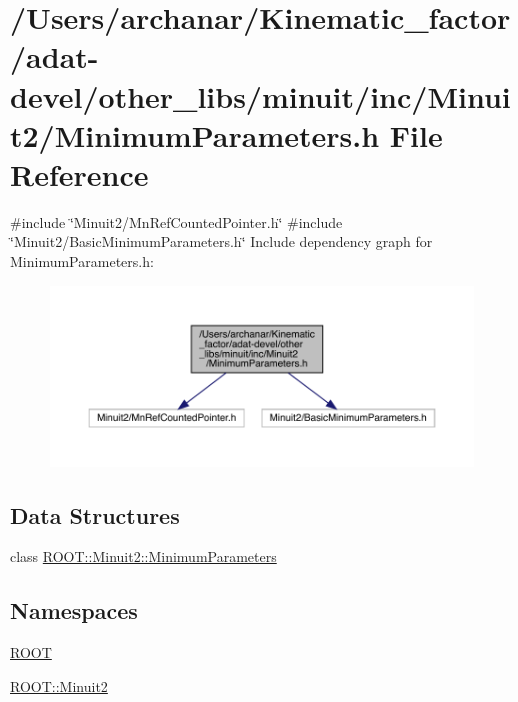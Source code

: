 \hypertarget{adat-devel_2other__libs_2minuit_2inc_2Minuit2_2MinimumParameters_8h}{}\section{/\+Users/archanar/\+Kinematic\+\_\+factor/adat-\/devel/other\+\_\+libs/minuit/inc/\+Minuit2/\+Minimum\+Parameters.h File Reference}
\label{adat-devel_2other__libs_2minuit_2inc_2Minuit2_2MinimumParameters_8h}
{\ttfamily \#include \char`\"{}Minuit2/\+Mn\+Ref\+Counted\+Pointer.\+h\char`\"{}}\newline
{\ttfamily \#include \char`\"{}Minuit2/\+Basic\+Minimum\+Parameters.\+h\char`\"{}}\newline
Include dependency graph for Minimum\+Parameters.\+h\+:
\nopagebreak
\begin{figure}[H]
\begin{center}
\leavevmode
\includegraphics[width=350pt]{df/d54/adat-devel_2other__libs_2minuit_2inc_2Minuit2_2MinimumParameters_8h__incl}
\end{center}
\end{figure}
\subsection*{Data Structures}
\begin{DoxyCompactItemize}
\item 
class \mbox{\hyperlink{classROOT_1_1Minuit2_1_1MinimumParameters}{R\+O\+O\+T\+::\+Minuit2\+::\+Minimum\+Parameters}}
\end{DoxyCompactItemize}
\subsection*{Namespaces}
\begin{DoxyCompactItemize}
\item 
 \mbox{\hyperlink{namespaceROOT}{R\+O\+OT}}
\item 
 \mbox{\hyperlink{namespaceROOT_1_1Minuit2}{R\+O\+O\+T\+::\+Minuit2}}
\end{DoxyCompactItemize}
